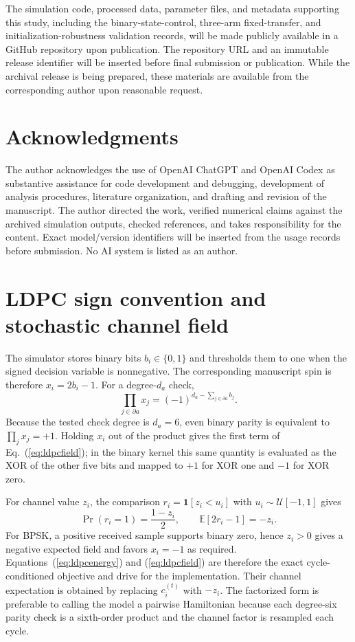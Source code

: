 \documentclass[aps,prapplied,reprint,superscriptaddress,longbibliography,floatfix]{revtex4-2}
\newcommand{\E}{\mathbb{E}}
\begin{document}
The simulation code, processed data, parameter files, and metadata supporting this study, including the binary-state-control, three-arm fixed-transfer, and initialization-robustness validation records, will be made publicly available in a GitHub repository upon publication.  The repository URL and an immutable release identifier will be inserted before final submission or publication.  While the archival release is being prepared, these materials are available from the corresponding author upon reasonable request.

\section*{Acknowledgments}

The author acknowledges the use of OpenAI ChatGPT and OpenAI Codex as substantive assistance for code development and debugging, development of analysis procedures, literature organization, and drafting and revision of the manuscript.  The author directed the work, verified numerical claims against the archived simulation outputs, checked references, and takes responsibility for the content.  Exact model/version identifiers will be inserted from the usage records before submission.  No AI system is listed as an author.

\clearpage
\appendix

\section{LDPC sign convention and stochastic channel field}
\label{app:mapping}

The simulator stores binary bits $b_i\in\{0,1\}$ and thresholds them to one when the signed decision variable is nonnegative.  The corresponding manuscript spin is therefore $x_i=2b_i-1$.  For a degree-$d_a$ check,
\begin{equation}
\prod_{j\in\partial a}x_j=(-1)^{d_a-\sum_{j\in\partial a}b_j}.
\label{eq:checkspin}
\end{equation}
Because the tested check degree is $d_a=6$, even binary parity is equivalent to $\prod_jx_j=+1$.  Holding $x_i$ out of the product gives the first term of Eq.~(\ref{eq:ldpcfield}); in the binary kernel this same quantity is evaluated as the XOR of the other five bits and mapped to $+1$ for XOR one and $-1$ for XOR zero.

For channel value $z_i$, the comparison $r_i=\mathbf 1[z_i<u_i]$ with $u_i\sim\mathcal U[-1,1]$ gives
\begin{equation}
\Pr(r_i=1)=\frac{1-z_i}{2},\qquad
\E[2r_i-1]=-z_i.
\label{eq:channelmean}
\end{equation}
For BPSK, a positive received sample supports binary zero, hence $z_i>0$ gives a negative expected field and favors $x_i=-1$ as required.  Equations~(\ref{eq:ldpcenergy}) and (\ref{eq:ldpcfield}) are therefore the exact cycle-conditioned objective and drive for the implementation.  Their channel expectation is obtained by replacing $c_i^{(t)}$ with $-z_i$.  The factorized form is preferable to calling the model a pairwise Hamiltonian because each degree-six parity check is a sixth-order product and the channel factor is resampled each cycle.
\end{document}
